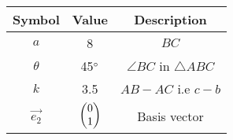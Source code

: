 \begin{tabular}{|c|c|c|}
  \hline
  \textbf{Symbol}&\textbf{Value}&\textbf{Description}\\
  \hline
  $a$ & 8 & $BC$\\
  \hline
	$\theta$ & 45$\degree{}$ & $\angle{BC}$ in $\triangle$$ABC$ \\
  \hline
	$k$ & 3.5 & $AB-AC$ i.e $c-b$ \\
  \hline 
	$\vec{e_2}$ & $\begin{pmatrix}
			0\\
			1\\
			\end{pmatrix}$ & Basis vector\\
 \hline			
\end{tabular}
